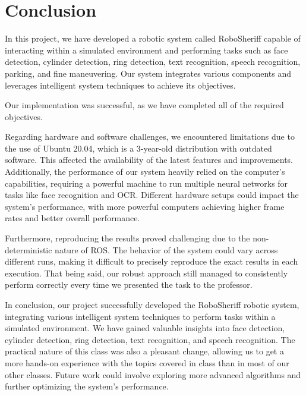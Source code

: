\documentclass{article}
\begin{document}
\section{Conclusion}

In this project, we have developed a robotic system called RoboSheriff capable of interacting within a simulated environment and performing tasks such as face detection, cylinder detection, ring detection, text recognition, speech recognition, parking, and fine maneuvering. Our system integrates various components and leverages intelligent system techniques to achieve its objectives.

Our implementation was successful, as we have completed all of the required objectives.

Regarding hardware and software challenges, we encountered limitations due to the use of Ubuntu 20.04, which is a 3-year-old distribution with outdated software. This affected the availability of the latest features and improvements. Additionally, the performance of our system heavily relied on the computer's capabilities, requiring a powerful machine to run multiple neural networks for tasks like face recognition and OCR. Different hardware setups could impact the system's performance, with more powerful computers achieving higher frame rates and better overall performance.

Furthermore, reproducing the results proved challenging due to the non-deterministic nature of ROS. The behavior of the system could vary across different runs, making it difficult to precisely reproduce the exact results in each execution. That being said, our robust approach still managed to consistently perform correctly every time we presented the task to the professor.

In conclusion, our project successfully developed the RoboSheriff robotic system, integrating various intelligent system techniques to perform tasks within a simulated environment. We have gained valuable insights into face detection, cylinder detection, ring detection, text recognition, and speech recognition. The practical nature of this class was also a pleasant change, allowing us to get a more hands-on experience with the topics covered in class than in most of our other classes. Future work could involve exploring more advanced algorithms and further optimizing the system's performance.
\end{document}
